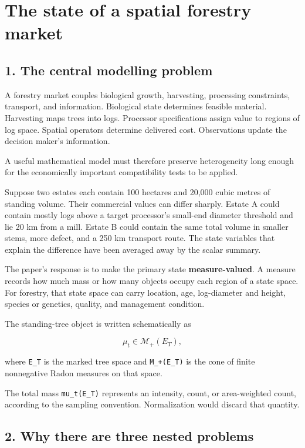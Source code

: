 \section{The state of a spatial forestry market}\label{the-state-of-a-spatial-forestry-market}

\subsection{1. The central modelling problem}\label{the-central-modelling-problem}

A forestry market couples biological growth, harvesting, processing constraints,
transport, and information. Biological state determines feasible material.
Harvesting maps trees into logs. Processor specifications assign value to
regions of log space. Spatial operators determine delivered cost. Observations
update the decision maker's information.

A useful mathematical model must therefore preserve heterogeneity long enough
for the economically important compatibility tests to be applied.

Suppose two estates each contain 100 hectares and 20,000 cubic metres of standing
volume. Their commercial values can differ sharply. Estate A could contain mostly
logs above a target processor's small-end
diameter threshold and lie 20 km from a mill. Estate B could contain the same
total volume in smaller stems, more defect, and a 250 km transport route. The
state variables that explain the difference have been averaged away by the
scalar summary.

The paper's response is to make the primary state \textbf{measure-valued}. A measure
records how much mass or how many objects occupy each region of a state space.
For forestry, that state space can carry location, age, log-diameter and height,
species or genetics, quality, and management condition.

The standing-tree object is written schematically as

\[
\mu_t \in \mathcal M_+(E_T),
\]

where \texttt{E\_T} is the marked tree space and \texttt{M\_+(E\_T)} is the cone of finite
nonnegative Radon measures on that space.

The total mass \texttt{mu\_t(E\_T)} represents an intensity, count, or area-weighted count,
according to the sampling convention. Normalization would discard that quantity.

\subsection{2. Why there are three nested problems}\label{why-there-are-three-nested-problems}

